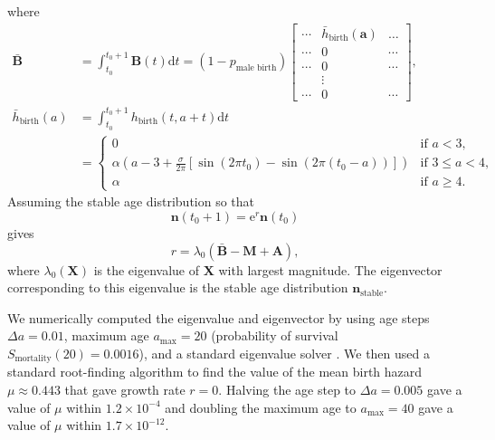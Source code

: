 \documentclass[12pt]{article}
\renewcommand{\vec}[1]{\mathbf{#1}}
\newcommand{\mat}[1]{\mathbf{#1}}
\newcommand{\md}{\mathrm{d}}
\newcommand{\me}{\mathrm{e}}
\begin{document}
where
\begin{equation}
  \begin{split}
    \bar{\mat{B}} &=
    \int_{t_0}^{t_0 + 1} \mat{B}(t) \md t =
    (1 - p_{\text{male birth}})
    \begin{bmatrix}
      \cdots & \bar{h}_{\text{birth}}(\vec{a}) & \dots
      \\
      \cdots & 0 & \cdots
      \\
      \cdots & 0 & \cdots
      \\
      & \vdots &
      \\
      \cdots & 0 & \cdots
    \end{bmatrix},
    \\
    \bar{h}_{\text{birth}}(a) &=
    \int_{t_0}^{t_0 + 1} h_{\text{birth}}(t, a + t) \md t
    \\
    &=
    \begin{cases}
      0 & \text{if $a < 3$},
      \\
      \alpha \left(
        a - 3 + \frac{\sigma}{2 \pi}
        \left[
          \sin\left(2\pi t_0\right)
          - \sin\left(2 \pi (t_0 - a)\right)
        \right]
      \right)
      & \text{if $3 \leq a < 4$},
      \\
      \alpha & \text{if $a \geq 4$}.
    \end{cases}
  \end{split}
\end{equation}
Assuming the stable age distribution so that
\begin{equation}
  \vec{n}(t_0 + 1) = \me^r \vec{n}(t_0)
\end{equation}
gives
\begin{equation}
  r = \lambda_0\left(\bar{\mat{B}} - \mat{M} + \mat{A}\right),
\end{equation}
where $\lambda_0(\mat{X})$ is the eigenvalue of $\mat{X}$ with largest
magnitude.  The eigenvector corresponding to this eigenvalue is the
stable age distribution $\vec{n}_{\text{stable}}$.

We numerically computed the eigenvalue and eigenvector by using age
steps $\Delta a = 0.01$, maximum age $a_{\text{max}} = 20$
(probability of survival $S_{\text{mortality}}(20) = 0.0016$), and a
standard eigenvalue solver
\citep[\texttt{numpy.linalg.eig},][]{scipy}.  We then used a standard
root-finding algorithm
\citep[\texttt{scipy.optimize.fsolve},][]{scipy} to find the value of
the mean birth hazard $\mu \approx 0.443$ that gave growth rate
$r = 0$.  Halving the age step to $\Delta a = 0.005$ gave a value of
$\mu$ within $1.2 \times 10^{-4}$ and doubling the maximum age to
$a_{\text{max}} = 40$ gave a value of $\mu$ within
$1.7 \times 10^{-12}$.
\end{document}
